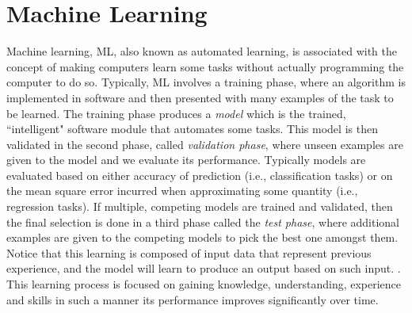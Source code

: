 \documentclass[12pt]{report}
\begin{document}
\section{Machine Learning}

Machine learning, \ac{ML}, also known as automated learning, is associated with the concept of making computers learn some tasks without actually 
programming the computer to do so. Typically, \ac{ML} involves a training phase, where an algorithm is implemented in software and then presented
with many examples of the task to be learned. The training phase produces a {\em model} which is the trained, ``intelligent" software module that automates some tasks. This model is then
validated in the second phase, called {\em validation phase}, where unseen examples are given to the model and we evaluate its performance. 
Typically models are evaluated based on either accuracy of prediction (i.e., classification tasks)  or on the mean square error incurred when approximating some quantity (i.e., regression tasks). If multiple, competing  models are trained and validated, then the final selection is done in a third phase called the 
{\em test phase}, where additional examples are given to the competing models to pick the best one amongst them. 
Notice that this learning is composed of  input data that represent previous experience, and the model will learn to produce an output based on such input.  \cite{Shai2014}. 
This learning process is focused on gaining knowledge, understanding, experience and skills \cite{Nilsson1998} in such a manner its performance improves significantly over time.

\end{document}
